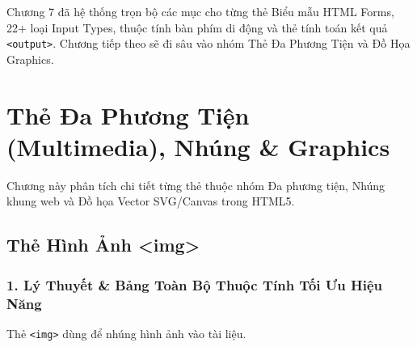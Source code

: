 \documentclass[11pt,oneside]{book}
\newcommand{\codeinline}[1]{\textcolor{accentOrange}{\texttt{#1}}}
\begin{document}
\begin{conceptBox}
Chương 7 đã hệ thống trọn bộ các mục cho từng thẻ Biểu mẫu HTML Forms, 22+ loại Input Types, thuộc tính bàn phím di động và thẻ tính toán kết quả \codeinline{<output>}. Chương tiếp theo sẽ đi sâu vào nhóm Thẻ Đa Phương Tiện và Đồ Họa Graphics.
\end{conceptBox}


\chapter{Thẻ Đa Phương Tiện (Multimedia), Nhúng \& Graphics}
\label{chap:multimedia_graphics}

Chương này phân tích chi tiết từng thẻ thuộc nhóm Đa phương tiện, Nhúng khung web và Đồ họa Vector SVG/Canvas trong HTML5.

\section{Thẻ Hình Ảnh <img>}
\subsection{1. Lý Thuyết \& Bảng Toàn Bộ Thuộc Tính Tối Ưu Hiệu Năng}
Thẻ \codeinline{<img>} dùng để nhúng hình ảnh vào tài liệu.
\end{document}
